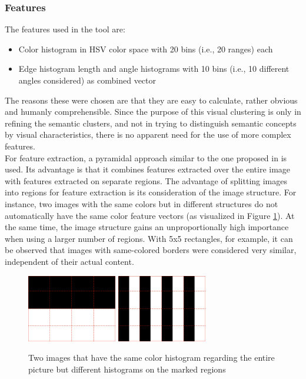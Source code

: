 \subsubsection{Features}
The features used in the tool are:
\begin{itemize}
\item{Color histogram} in HSV color space with 20 bins (i.e., 20 ranges) each
\item{Edge histogram} length and angle histograms with 10 bins (i.e., 10 different angles considered) as combined vector
\end{itemize}
The reasons these were chosen are that they are easy to calculate, rather obvious and humanly comprehensible. Since the purpose of this visual clustering is only in refining the semantic clusters, and not in trying to distinguish semantic concepts by visual characteristics, there is no apparent need for the use of more complex features.\\
For feature extraction, a pyramidal approach similar to the one proposed in \cite{Lazebnik2006} is used. Its advantage is that it combines features extracted over the entire image with features extracted on separate regions. The advantage of splitting images into regions for feature extraction is its consideration of the image structure. For instance, two images with the same colors but in different structures do not automatically have the same color feature vectors (as visualized in Figure \ref{fig_blackwhite}). At the same time, the image structure gains an unproportionally high importance when using a larger number of regions. With 5x5 rectangles, for example, it can be observed that images with same-colored borders were considered very similar, independent of their actual content.

\begin{figure}[h]
\centering
\includegraphics[width=0.35\textwidth]{images/blackwhite1.pdf}
\includegraphics[width=0.35\textwidth]{images/blackwhite2.pdf}
\caption{Two images that have the same color histogram regarding the entire picture but different histograms on the marked regions}
\label{fig_blackwhite}
\end{figure}

